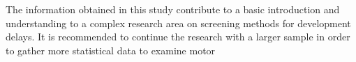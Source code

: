 The information obtained in this study contribute to a basic introduction and understanding to a complex research area on screening methods for development delays. It is recommended to continue the research with a larger sample in order to gather more statistical data to examine motor  





\hypersetup{pageanchor=false}